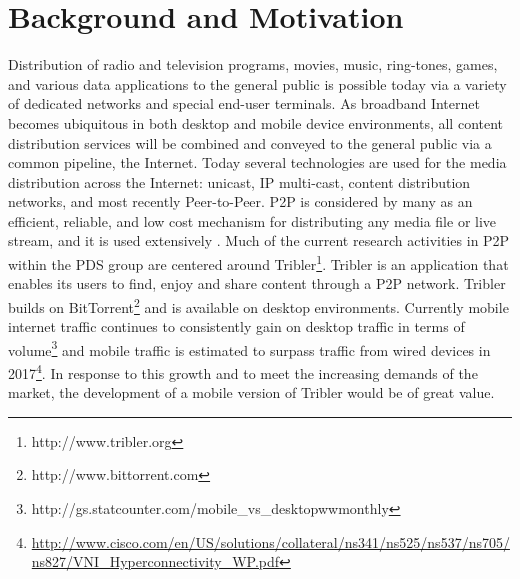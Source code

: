\section{Background and Motivation}
Distribution of radio and television programs, movies, music, ring-tones, games, and various data applications to the general public is possible today via a variety of dedicated networks and special end-user terminals. As broadband Internet becomes ubiquitous in both desktop and mobile device environments, all content distribution services will be combined and conveyed to the general public via a common pipeline, the Internet. Today several technologies are used for the media distribution across the Internet: unicast, IP multi-cast, content distribution networks, and most recently Peer-to-Peer. P2P is considered by many as an efficient, reliable, and low cost mechanism for distributing any media file or live stream, and it is used extensively \cite{internet_study}. Much of the current research activities in P2P within the PDS group are centered around Tribler\footnote{http://www.tribler.org}. Tribler is an application that enables its users to find, enjoy and share content through a P2P network. Tribler builds on BitTorrent\footnote{http://www.bittorrent.com} and is available on desktop environments. Currently mobile internet traffic continues to consistently gain on desktop traffic in terms of volume\footnote{http://gs.statcounter.com/mobile\_vs\_desktop\-ww\-monthly} and mobile traffic is estimated to surpass traffic from wired devices in 2017\footnote{\url{http://www.cisco.com/en/US/solutions/collateral/ns341/ns525/ns537/ns705/ns827/VNI\_Hyperconnectivity\_WP.pdf}}. In response to this growth and to meet the increasing demands of the market, the development of a mobile version of Tribler would be of great value. 
